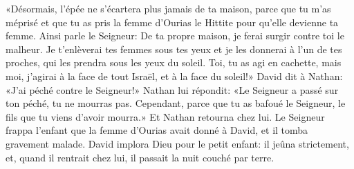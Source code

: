 «Désormais, l’épée ne s’écartera plus jamais de ta maison,
	parce que tu m’as méprisé
	et que tu as pris la femme d’Ourias le Hittite pour qu’elle devienne ta femme.
Ainsi parle le Seigneur:
	De ta propre maison, je ferai surgir contre toi le malheur.
Je t’enlèverai tes femmes sous tes yeux
	et je les donnerai à l’un de tes proches, qui les prendra sous les yeux du soleil.
Toi, tu as agi en cachette,
	mais moi, j’agirai à la face de tout Israël, et à la face du soleil!»
David dit à Nathan: «J’ai péché contre le Seigneur!»
Nathan lui répondit: «Le Seigneur a passé sur ton péché, tu ne mourras pas.
	Cependant, parce que tu as bafoué le Seigneur,
	le fils que tu viens d’avoir mourra.»
Et Nathan retourna chez lui.
Le Seigneur frappa l’enfant que la femme d’Ourias avait donné à David,
	et il tomba gravement malade.
David implora Dieu pour le petit enfant:
	il jeûna strictement,
	et, quand il rentrait chez lui, il passait la nuit couché par terre.
